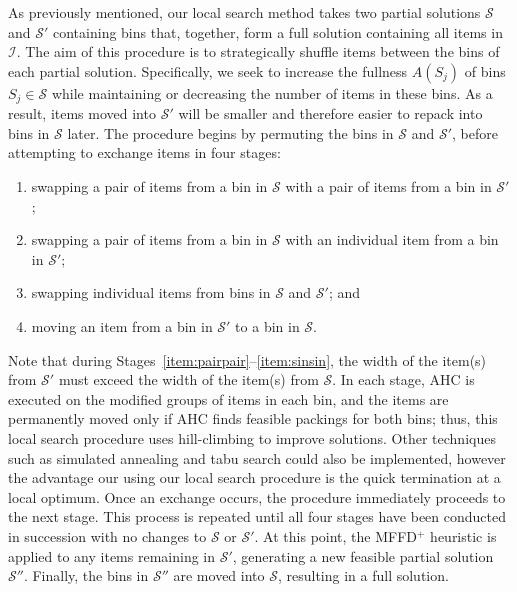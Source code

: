 \documentclass[a4paper,11pt,authoryear]{elsarticle}
\newcommand{\rev}[1]{{\color{myRed}#1}}
\begin{document}
\noindent As previously mentioned, our local search method takes two partial solutions $\mathcal{S}$ and $\mathcal{S}'$ containing bins that, together, form a full solution containing all items in $\mathcal{I}$. The aim of this procedure is to strategically shuffle items between the bins of each partial solution. Specifically, we seek to increase the fullness $A(S_j)$ of bins $S_j \in \mathcal{S}$ while maintaining or decreasing the number of items in these bins. As a result, items moved into $\mathcal{S}'$ will be smaller and therefore easier to repack into bins in $\mathcal{S}$ later. The procedure begins by permuting the bins in $\mathcal{S}$ and $\mathcal{S}'$, before attempting to exchange items in four stages:
\begin{enumerate}[label={(\arabic*)},itemsep=-0.2em]
	\item swapping a pair of items from a bin in $\mathcal{S}$ with a pair of items from a bin in $\mathcal{S}'$;\label{item:pairpair}
	\item swapping a pair of items from a bin in $\mathcal{S}$ with an individual item from a bin in $\mathcal{S}'$;\label{item:pairsin}
	\item swapping individual items from bins in $\mathcal{S}$ and $\mathcal{S}'$;\label{item:sinsin} and
	\item moving an item from a bin in $\mathcal{S}'$ to a bin in $\mathcal{S}$.\label{item:movesin}
\end{enumerate} 
Note that during Stages~\ref{item:pairpair}--\ref{item:sinsin}, the width of the item(s) from $\mathcal{S}'$ must exceed the width of the item(s) from $\mathcal{S}$. In each stage, AHC is executed on the modified groups of items in each bin, and the items are permanently moved only if AHC finds feasible packings for both bins; \rev{thus, this local search procedure uses hill-climbing to improve solutions. Other techniques such as simulated annealing and tabu search could also be implemented, however the advantage our using our local search procedure is the quick termination at a local optimum.} Once an exchange occurs, the procedure immediately proceeds to the next stage. This process is repeated until all four stages have been conducted in succession with no changes to $\mathcal{S}$ or $\mathcal{S}'$. At this point, the MFFD$^+$ heuristic is applied to any items remaining in $\mathcal{S}'$, generating a new feasible partial solution $\mathcal{S}''$. Finally, the bins in $\mathcal{S}''$ are moved into $\mathcal{S}$, resulting in a full solution.
\end{document}
